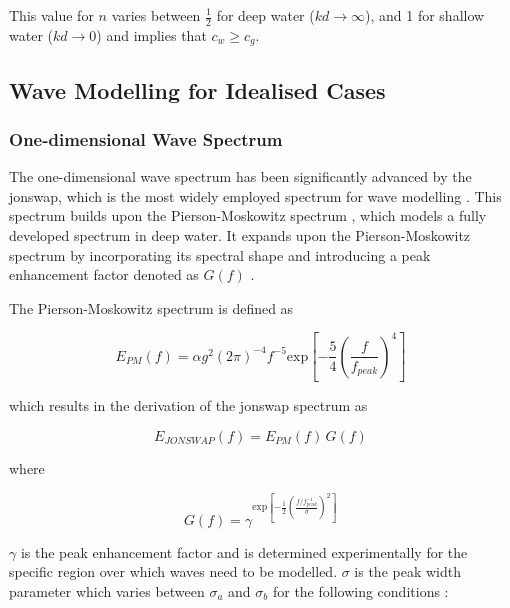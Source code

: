 This value for $n$ varies between $\frac{1}{2}$ for deep water ($kd \to \infty$), and 1 for shallow water \cite{Holthuijsen2007} ($kd \to 0$) and implies that $c_{w} \geq c_{g}$. 

\subsection{Wave Modelling for Idealised Cases} \label{subsec:theory.waves.modelling}

\subsubsection{One-dimensional Wave Spectrum} \label{subsubsec:theory.waves.modelling.1D}

The one-dimensional wave spectrum has been significantly advanced by the \acf{jonswap}, which is the most widely employed spectrum for wave modelling \cite{Holthuijsen2007}. This spectrum builds upon the Pierson-Moskowitz spectrum \cite{Pierson1964}, which models a fully developed spectrum in deep water. It expands upon the Pierson-Moskowitz spectrum by incorporating its spectral shape and introducing a peak enhancement factor denoted as $G(f)$ \cite{Hasselmann1973JONSWAP,Hasselmann1974JONSWAP}.

The Pierson-Moskowitz spectrum is defined as

\begin{equation} \label{eq:piersonMoskowitz}
    E_{PM} (f) = \alpha g^{2}(2\pi)^{-4}f^{-5}\text{exp} \left [ -\frac{5}{4} \left ( \frac{f}{f_{peak}}\right ) ^{4} \right]
\end{equation}

which results in the derivation of the \acs{jonswap} spectrum as

\begin{equation} \label{eq:jonswap.itoPiersonMoskowitz}
    E_{JONSWAP} (f) = E_{PM} (f) \, G(f)
\end{equation}

where 

\begin{equation} \label{eq:jonswap.peakEnhancementFactor}
    G(f) = \gamma ^{\text{exp} \left [  - \frac{1}{2} \left ( \frac{f/f_{peak}^{-1}}{\sigma} \right )^2 \right ]}
\end{equation}

$\gamma$ is the peak enhancement factor and is determined experimentally for the specific region over which waves need to be modelled. $\sigma$ is the peak width parameter which varies between $\sigma_{a}$ and $\sigma_{b}$ for the following conditions \cite{Holthuijsen2007}:

